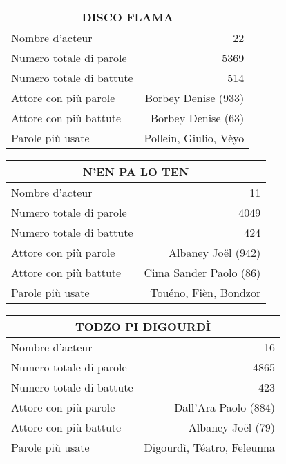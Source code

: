     \begin{table}[]
    \centering
    \begin{tabular}{lr}\toprule\multicolumn{2}{c}{DISCO FLAMA} \\\midrule
\multicolumn{1}{l}{Nombre d'acteur}&22\\
\multicolumn{1}{l}{Numero totale di parole}&5369\\
\multicolumn{1}{l}{Numero totale di battute}&514\\
\multicolumn{1}{l}{Attore con più parole}&Borbey Denise (933)\\
\multicolumn{1}{l}{Attore con più battute}&Borbey Denise (63)\\
\multicolumn{1}{l}{Parole più usate}&Pollein, Giulio, Vèyo\\
    \bottomrule
    \end{tabular}%
    \end{table}
    \begin{table}[]
    \centering
    \begin{tabular}{lr}\toprule\multicolumn{2}{c}{N'EN PA LO TEN} \\\midrule
\multicolumn{1}{l}{Nombre d'acteur}&11\\
\multicolumn{1}{l}{Numero totale di parole}&4049\\
\multicolumn{1}{l}{Numero totale di battute}&424\\
\multicolumn{1}{l}{Attore con più parole}&Albaney Joël (942)\\
\multicolumn{1}{l}{Attore con più battute}&Cima Sander Paolo (86)\\
\multicolumn{1}{l}{Parole più usate}&Touéno, Fièn, Bondzor\\
    \bottomrule
    \end{tabular}%
    \end{table}
    \begin{table}[]
    \centering
    \begin{tabular}{lr}\toprule\multicolumn{2}{c}{TODZO PI DIGOURDÌ} \\\midrule
\multicolumn{1}{l}{Nombre d'acteur}&16\\
\multicolumn{1}{l}{Numero totale di parole}&4865\\
\multicolumn{1}{l}{Numero totale di battute}&423\\
\multicolumn{1}{l}{Attore con più parole}&Dall'Ara Paolo (884)\\
\multicolumn{1}{l}{Attore con più battute}&Albaney Joël (79)\\
\multicolumn{1}{l}{Parole più usate}&Digourdì, Téatro, Feleunna\\
    \bottomrule
    \end{tabular}%
    \end{table}
